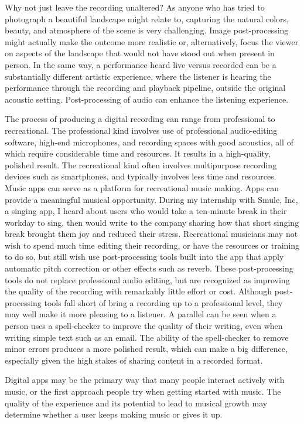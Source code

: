 Why not just leave the recording unaltered? As anyone who has tried to photograph a beautiful landscape might relate to, capturing the natural colors, beauty, and atmosphere of the scene is very challenging. Image post-processing might actually make the outcome more realistic or, alternatively, focus the viewer on aspects of the landscape that would not have stood out when present in person. In the same way, a performance heard live versus recorded can be a substantially different artistic experience, where the listener is hearing the performance through the recording and playback pipeline, outside the original acoustic setting. Post-processing of audio can enhance the listening experience. 

The process of producing a digital recording can range from professional to recreational. The professional kind involves use of professional audio-editing software, high-end microphones, and recording spaces with good acoustics, all of which require considerable time and resources. It results in a high-quality, polished result. The recreational kind often involves multipurpose recording devices such as smartphones, and typically involves less time and resources. Music apps can serve as a platform for recreational music making. Apps can provide a meaningful musical opportunity. During my internship with Smule, Inc, a singing app, I heard about users who would take a ten-minute break in their workday to sing, then would write to the company sharing how that short singing break brought them joy and reduced their stress. Recreational musicians may not wish to spend much time editing their recording, or have the resources or training to do so, but still wish use post-processing tools built into the app that apply automatic pitch correction or other effects such as reverb. These post-processing tools do not replace professional audio editing, but are recognized as improving the quality of the recording with remarkably little effort or cost. Although post-processing tools fall short of bring a recording up to a professional level, they may well make it more pleasing to a listener. A parallel can be seen when a person uses a spell-checker to improve the quality of their writing, even when writing simple text such as an email. The ability of the spell-checker to remove minor errors produces a more polished result, which can make a big difference, especially given the high stakes of sharing content in a recorded format.

Digital apps may be the primary way that many people interact actively with music, or the first approach people try when getting started with music. The quality of the experience and its potential to lead to musical growth may determine whether a user keeps making music or gives it up.

